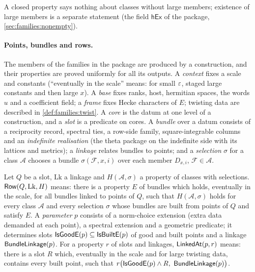 A closed property says nothing about classes without large members; existence of large members is a separate
statement (the field $\mathsf{hEx}$ of the package, \cref{sec:families:nonempty}).

\paragraph{Points, bundles and rows.}
The members of the families in the package are produced by a construction, and their properties are proved
uniformly for all its outputs. A \emph{context} fixes a scale and constants (``eventually in the scale'' means:
for small $\varepsilon$, staged large constants and then large $x$). A \emph{base} fixes ranks, host, hermitian spaces,
the words $u$ and a coefficient field; a \emph{frame} fixes Hecke characters of $E$; twisting data are described
in \cref{def:families:twist}. A \emph{core} is the datum at one level of a construction, and a \emph{slot} is a
predicate on cores. A \emph{bundle} over a datum consists of a reciprocity record, spectral ties, a row-side
family, square-integrable columns and an \emph{indefinite realisation} (the theta package on the indefinite side
with its lattices and metrics); a \emph{linkage} relates bundles to points; and a \emph{selection} $\sigma$ for a
class $\mathcal A$ chooses a bundle $\sigma(\mathcal F,x,i)$ over each member $D_{x,i}$, $\mathcal F\in\mathcal A$.

\begin{definition}\label{def:families:rows}
Let $Q$ be a slot, $\mathrm{Lk}$ a linkage and $H(\mathcal A,\sigma)$ a property of classes with selections.
$\mathsf{Row}(Q,\mathrm{Lk},H)$ means: there is a property $E$ of bundles which holds, eventually in the scale,
for all bundles linked to points of $Q$, such that $H(\mathcal A,\sigma)$ holds for every class $\mathcal A$
and every selection $\sigma$ whose bundles are built from points of $Q$ and satisfy $E$. A \emph{parameter}
$p$ consists of a norm-choice extension (extra data demanded at each point), a spectral extension and a
geometric predicate; it determines slots $\mathsf{IsGoodE}(p)\subseteq\mathsf{IsBuiltE}(p)$ of good and built
points and a linkage $\mathsf{BundleLinkage}(p)$. For a property $r$ of slots and linkages,
$\mathsf{LinkedAt}(p,r)$ means: there is a slot $R$ which, eventually in the scale and for large twisting data,
contains every built point, such that $r\bigl(\sfname{IsGoodE}(p)\wedge R,\ \sfname{BundleLinkage}(p)\bigr)$.
\end{definition}

